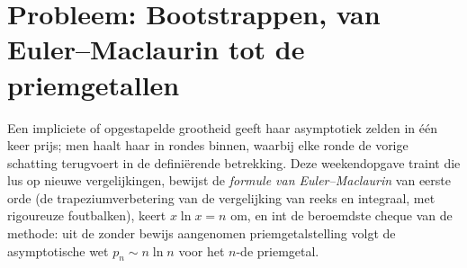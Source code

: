 \section{Probleem: Bootstrappen, van Euler--Maclaurin tot de
priemgetallen}

Een impliciete of opgestapelde grootheid geeft haar asymptotiek
zelden in één keer prijs; men haalt haar in rondes binnen, waarbij
elke ronde de vorige schatting terugvoert in de definiërende
betrekking. Deze weekendopgave traint die lus op nieuwe
vergelijkingen, bewijst de \emph{formule van Euler--Maclaurin} van
eerste orde (de trapeziumverbetering van de vergelijking van reeks
en integraal, met rigoureuze foutbalken), keert $x\ln x = n$ om, en
int de beroemdste cheque van de methode: uit de zonder bewijs
aangenomen priemgetalstelling volgt de asymptotische wet $p_n \sim
n\ln n$ voor het $n$-de priemgetal.

